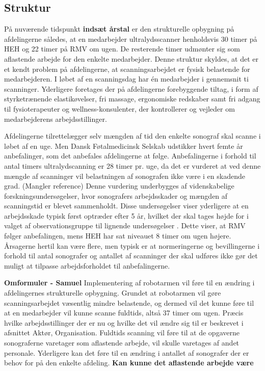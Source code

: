 \subsection{Struktur}
På nuværende tidspunkt \textbf{indsæt årstal} er den strukturelle opbygning på afdelingerne således, at en medarbejder ultralydsscanner henholdsvis 30 timer på HEH og 22 timer på RMV om ugen. De resterende timer udmønter sig som aflastende arbejde for den enkelte medarbejder. Denne struktur skyldes, at det er et kendt problem på afdelingerne, at scanningsarbejdet er fysisk belastende for medarbejderen. I løbet af en scanningsdag har én medarbejder i gennemsnit ti scanninger. Yderligere foretages der på afdelingerne forebyggende tiltag, i form af styrketrænende elastikøvelser, fri massage, ergonomiske redskaber samt fri adgang til fysioterapeuter og wellness-konsulenter, der kontrollerer og vejleder om medarbejderens arbejdsstillinger.

Afdelingerne tilrettelægger selv mængden af tid den enkelte sonograf skal scanne i løbet af en uge. Men Dansk Føtalmedicinsk Selskab udstikker hvert femte år anbefalinger, som det anbefales afdelingerne at følge. Anbefalingerne i forhold til antal timers ultralydscanning er 28 timer pr. uge, da det er vurderet at ved denne mængde af scanninger vil belastningen af sonografen ikke være i en skadende grad. (Mangler reference) Denne vurdering underbygges af videnskabelige forskningsundersøgelser, hvor sonografers arbejdsskader og mængden af scanningstid er blevet sammenholdt. Disse undersøgelser viser yderligere at en arbejdsskade typisk først optræder efter 5 år, hvilket der skal tages højde for i valget af observationsgruppe til lignende undersøgelser \cite{35}.
Dette viser, at RMV følger anbefalingen, mens HEH har sat niveauet 8 timer om ugen højere. Årsagerne hertil kan være flere, men typisk er at normeringerne og bevillingerne i forhold til antal sonografer og antallet af scanninger der skal udføres ikke gør det muligt at tilpasse arbejdsforholdet til anbefalingerne. 

\textbf{Omformuler - Samuel}
Implementering af robotarmen vil føre til en ændring i afdelingernes strukturelle opbygning. Grundet at robotarmen vil gøre scanningsarbejdet væsentlig mindre belastende, og dermed vil det kunne føre til at en medarbejder vil kunne scanne fuldtids, altså 37 timer om ugen. Præcis hvilke arbejdsstillinger der er nu og hvilke det vil ændre sig til er beskrevet i afsnittet Aktør, Organisation. Fuldtids scanning vil føre til at de opgaverne sonograferne varetager som aflastende arbejde, vil skulle varetages af andet personale. Yderligere kan det føre til en ændring i antallet af sonografer der er behov for på den enkelte afdeling. \textbf{Kan kunne det aflastende arbejde være}

